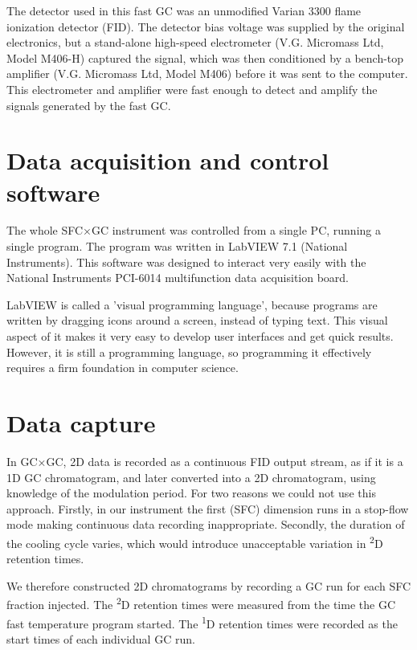 The detector used in this fast GC was an unmodified Varian\texttrademark{} 3300
flame ionization detector (FID). The detector bias voltage was supplied by the
original electronics, but a stand-alone high-speed electrometer (V.G. Micromass
Ltd, Model M406-H) captured the signal, which was then conditioned by a
bench-top amplifier (V.G. Micromass Ltd, Model M406) before it was sent to the
computer. This electrometer and amplifier were fast enough to detect and amplify
the signals generated by the fast GC.

\section{Data acquisition and control software}

The whole SFC×GC instrument was controlled from a single PC, running a single
program. The program was written in LabVIEW 7.1\texttrademark{} (National
Instruments). This software was designed to interact very easily with the
National Instruments PCI-6014 multifunction data acquisition board.

LabVIEW is called a 'visual programming language', because programs are written
by dragging icons around a screen, instead of typing text. This visual aspect of
it makes it very easy to develop user interfaces and get quick results. However,
it is still a programming language, so programming it effectively requires a
firm foundation in computer science.

\section{Data capture}

In GC×GC, 2D data is recorded as a continuous FID output stream, as if it is a
1D GC chromatogram, and later converted into a 2D chromatogram, using knowledge
of the modulation period. For two reasons we could not use this approach.
Firstly, in our instrument the first (SFC) dimension runs in a stop-flow mode
making continuous data recording inappropriate. Secondly, the duration of the
cooling cycle varies, which would introduce unacceptable variation in
\textsuperscript{2}D retention times.

We therefore constructed 2D chromatograms by recording a GC run for each SFC
fraction injected. The \textsuperscript{2}D retention times were measured from
the time the GC fast temperature program started. The \textsuperscript{1}D
retention times were recorded as the start times of each individual GC run.

